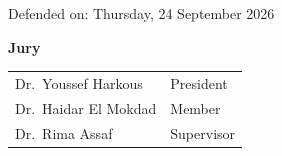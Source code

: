 \begin{titlepage}
\vspace{9mm}
{\normalsize Defended on: Thursday, 24 September 2026\par}

\vfill

{\large\bfseries Jury\par}
\vspace{2.5mm}
{\normalsize
\begin{tabular}{@{}ll@{}}
Dr.~Youssef Harkous    & President  \\[1pt]
Dr.~Haidar El Mokdad   & Member     \\[1pt]
Dr.~Rima Assaf         & Supervisor \\
\end{tabular}\par}
\end{titlepage}
